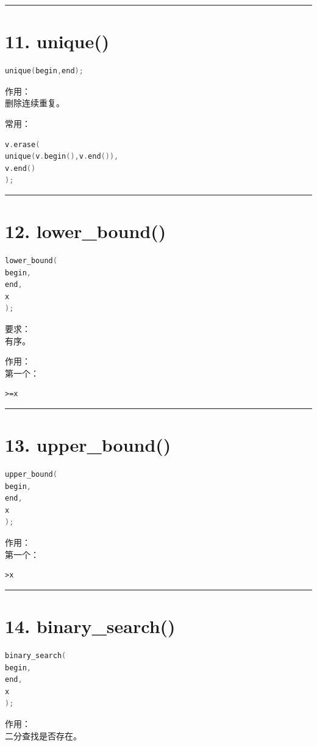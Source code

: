 \documentclass[9pt,twocolumn]{extarticle}
\begin{document}
\noindent\rule{\linewidth}{0.4pt}

\section{11. unique()}
\begin{lstlisting}[language=C++]
unique(begin,end);
\end{lstlisting}
作用：\\
删除连续重复。

常用：
\begin{lstlisting}[language=C++]
v.erase(
unique(v.begin(),v.end()),
v.end()
);
\end{lstlisting}

\noindent\rule{\linewidth}{0.4pt}

\section{12. lower\_bound()}
\begin{lstlisting}[language=C++]
lower_bound(
begin,
end,
x
);
\end{lstlisting}
要求：\\
有序。

作用：\\
第一个：
\begin{lstlisting}
>=x
\end{lstlisting}

\noindent\rule{\linewidth}{0.4pt}

\section{13. upper\_bound()}
\begin{lstlisting}[language=C++]
upper_bound(
begin,
end,
x
);
\end{lstlisting}
作用：\\
第一个：
\begin{lstlisting}
>x
\end{lstlisting}

\noindent\rule{\linewidth}{0.4pt}

\section{14. binary\_search()}
\begin{lstlisting}[language=C++]
binary_search(
begin,
end,
x
);
\end{lstlisting}
作用：\\
二分查找是否存在。
\end{document}
